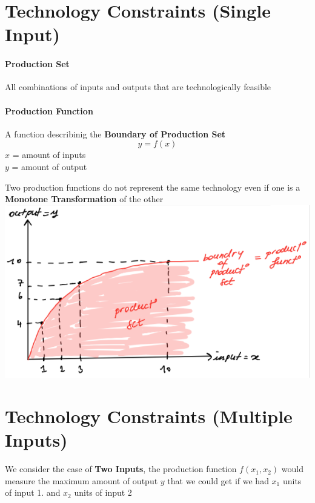 \documentclass{report}
\begin{document}
\section{Technology Constraints (Single Input)}
\begin{defbox}
\paragraph{Production Set}All combinations of inputs and outputs that are technologically feasible
\end{defbox}
\begin{defbox}
\paragraph{Production Function}A function describinig the \textbf{Boundary of Production Set}
$$y=f(x)$$
$x$ = amount of inputs\\$y$ = amount of output
\end{defbox}
Two production functions do not represent the same technology even if one is a \textbf{Monotone Transformation} of the other\\
\includegraphics[width = \textwidth]{econ1}
\section{Technology Constraints (Multiple Inputs)}
We consider the case of \textbf{Two Inputs}, the production function $f(x_1,x_2)$ would measure the maximum amount of output $y$ that we could get if we had $x_1$ units of input 1. and $x_2$ units of input 2
\end{document}
